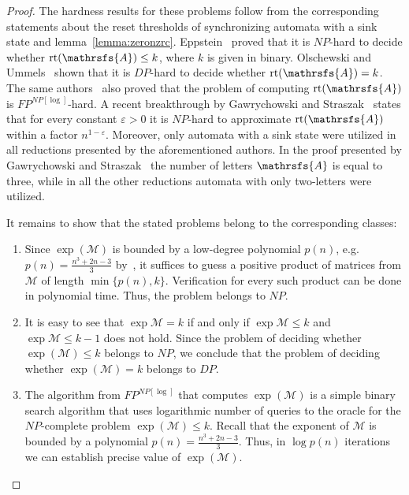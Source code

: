 \documentclass[a4paper,USenglish]{lipics}
\DeclareMathOperator{\rt}{rt}
\theoremstyle{definition}
\begin{document}
\begin{proof}
The hardness results for these problems follow from the corresponding statements about the reset thresholds of synchronizing automata with a sink state and lemma~\ref{lemma:zeronzrc}. Eppstein~\cite{Ep1990} proved that it is $NP$-hard to decide whether $\rt(\mathrsfs{A}) \leq k$, where $k$ is given in binary. Olschewski and Ummels~\cite[Theorem 1]{OM2010} shown that it is $DP$-hard to decide whether $\rt(\mathrsfs{A}) = k$. The same authors~\cite[Theorem 4]{OM2010} also proved that the problem of computing $\rt(\mathrsfs{A})$ is $FP^{NP[\log]}$-hard. A recent breakthrough by Gawrychowski and Straszak~\cite[Theorem 16]{GawrychowskiStraszak2015StrongInapproximabilityOfTheShortestResetWord} states that for every constant $\varepsilon>0$ it is $NP$-hard to approximate $\rt(\mathrsfs{A})$ within a factor $n^{1-\varepsilon}$. Moreover, only automata with a sink state were utilized in all reductions presented by the aforementioned authors. In the proof presented by Gawrychowski and Straszak~\cite[Theorem 16]{GawrychowskiStraszak2015StrongInapproximabilityOfTheShortestResetWord} the number of letters $\mathrsfs{A}$ is equal to three, while in all the other reductions automata with only two-letters were utilized.

It remains to show that the stated problems belong to the corresponding classes:
\begin{enumerate}
\item Since $\exp(\mathcal{M})$ is bounded by a low-degree polynomial $p(n)$, e.g. $p(n)=\frac{n^3 +2n -3}{3}$ by~\cite[Corollary 18]{BJO15}, it suffices to guess a positive product of matrices from $\mathcal{M}$ of length $\min\{ p(n), k\}$. Verification for every such product can be done in polynomial time. Thus, the problem belongs to $NP$.
\item It is easy to see that $\exp{\mathcal{M}}=k$ if and only if $\exp{\mathcal{M}} \leq k$ and $\exp{\mathcal{M}} \leq k-1$ does not hold. Since the problem of deciding whether $\exp(\mathcal{M}) \leq k$ belongs to $NP$, we conclude that the problem of deciding whether $\exp(\mathcal{M}) = k$ belongs to $DP$.
\item The algorithm from $FP^{NP[\log]}$ that computes $\exp(\mathcal{M})$ is a simple binary search algorithm that uses logarithmic number of queries to the oracle for the $NP$-complete problem $\exp(\mathcal{M}) \leq k$. Recall that the exponent of $\mathcal{M}$ is bounded by a polynomial $p(n)=\frac{n^3 +2n -3}{3}$. Thus, in $\log p(n)$ iterations we can establish precise value of $\exp(\mathcal{M})$.
\end{enumerate}
\end{proof}
\end{document}
